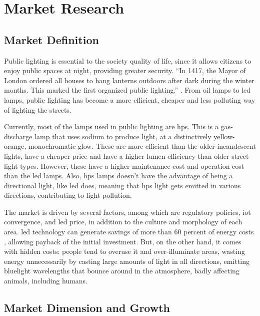 \section{Market Research}
\subsection{Market Definition}
Public lighting is essential to the society quality of life, since it allows citizens to enjoy public spaces at night, providing greater security. “In 1417, the Mayor of London ordered all houses to hang lanterns outdoors after dark during the winter months. This marked the first organized public lighting.” \cite{street_lighting_history}. From oil lamps to \ac{led} lamps, public lighting has become a more efficient, cheaper and less polluting way of lighting the streets. 

Currently, most of the lamps used in public lighting are \ac{hps}. This is a gas-discharge lamp that uses sodium to produce light, at a distinctively yellow-orange, monochromatic glow. These are more efficient than the older incandescent lights, have a cheaper price and have a higher lumen efficiency than older street light types. %
However, these have a higher maintenance cost and operation cost than the \ac{led} lamps. Also, \ac{hps} lamps doesn’t have the advantage of being a directional light, like \ac{led} does, meaning that \ac{hps} light gets emitted in various directions, contributing to light pollution. \cite{led_vs_hps}

The market is driven by several factors, among which are regulatory policies, \ac{iot} convergence, and \ac{led} price, in addition to the culture and morphology of each area. \ac{led} technology can generate savings of more than 60 percent of energy costs \cite{light_pollution}, allowing payback of the initial investment. But, on the other hand, it comes with hidden costs: people tend to overuse it and over-illuminate areas, wasting energy unnecessarily by casting large amounts of light in all directions, emitting bluelight wavelengths that bounce around in the atmosphere, badly affecting animals, including humans.

\subsection{Market Dimension and Growth}

